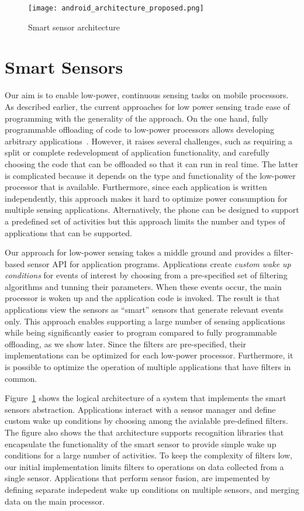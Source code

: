 
\begin{figure}[p]
	\texttt{[image: android\_architecture\_proposed.png]}
	\caption{Smart sensor architecture}
    \label{fig:smartarchitecture}
\end{figure}


\section{Smart Sensors}
\label{sec:approach}

Our aim is to enable low-power, continuous sensing tasks on mobile
processors.  As described earlier, the current approaches for low
power sensing trade ease of programming with the generality of the
approach. On the one hand, fully programmable offloading of code to
low-power processors allows developing arbitrary
applications~\cite{reflex,turducken}. However, it raises several
challenges, such as requiring a split or complete redevelopment of
application functionality, and carefully choosing the code that can be
offloaded so that it can run in real time. The latter is complicated
because it depends on the type and functionality of the low-power
processor that is available.  Furthermore, since each application is
written independently, this approach makes it hard to optimize power
consumption for multiple sensing applications. Alternatively, the
phone can be designed to support a predefined set of activities but
this approach limits the number and types of applications that can be
supported.

Our approach for low-power sensing takes a middle ground and provides
a filter-based sensor API for application programs. Applications
create {\em custom wake up conditions} for events of interest by
choosing from a pre-specified set of filtering algorithms and tunning
their parameters.  When these events occur, the main processor is
woken up and the application code is invoked. The result is that
applications view the sensors as ``smart'' sensors that generate
relevant events only. This approach enables supporting a large number
of sensing applications while being significantly easier to program
compared to fully programmable offloading, as we show later. Since the
filters are pre-specified, their implementations can be optimized for
each low-power processor. Furthermore, it is possible to optimize the
operation of multiple applications that have filters in common.

Figure~\ref{fig:smartarchitecture} shows the logical architecture of a
system that implements the smart sensors abstraction.  Applications
interact with a sensor manager and define custom wake up conditions by
choosing among the avialable pre-defined filters.  The figure also
shows the that architecture supports recognition libraries that
encapsulate the functionality of the smart sensor to provide simple
wake up conditions for a large number of activities.  To keep the
complexity of filters low, our initial implementation limits filters
to operations on data collected from a single sensor.  Applications
that perform sensor fusion, are impemented by defining separate
indepedent wake up conditions on multiple sensors, and merging data on
the main processor.





